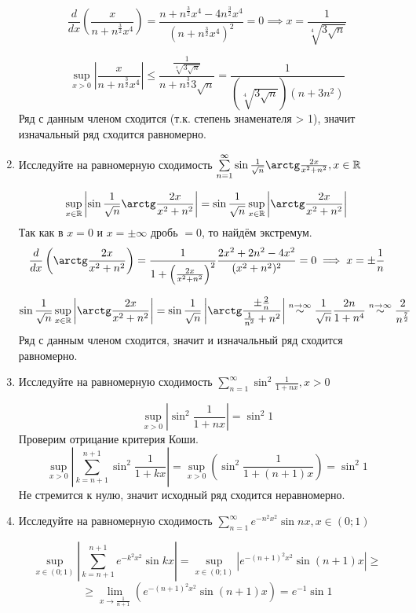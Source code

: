 \documentclass{article}
\begin{document}
\begin{large}
\begin{enumerate}
$$ \frac{d}{dx} \left( \frac{x}{n + n^{\frac{3}{2}}x^4} \right) = \frac{n + n^{\frac{3}{2}}x^4 - 4n^{\frac{3}{2}}x^4}{(n + n^{\frac{3}{2}}x^4)^2} = 0 \implies x = \frac{1}{\sqrt[4]{3\sqrt{n}}} $$

$$ \sup_{x>0} \left| \frac{x}{n + n^{\frac{3}{2}}x^4} \right| \leq \frac{\frac{1}{\sqrt[4]{3\sqrt{n}}}}{n + n^{\frac{3}{2}} 3\sqrt{n}} = \frac{1}{(\sqrt[4]{3\sqrt{n}})(n + 3n^2)}$$
Ряд с данным членом сходится (т.к. степень знаменателя > 1), значит изначальный ряд сходится равномерно.

\item Исследуйте на равномерную сходимость $ \sum\limits_{n=1}^{\infty} \sin \frac{1}{\sqrt{n}} \arctg \frac{2x}{x^2 + n^2}, x \in \mathbb{R} $

$$ \sup_{x \in \mathbb{R}} \left| \sin \frac{1}{\sqrt{n}} \arctg \frac{2x}{x^2 + n^2} \right| = \sin \frac{1}{\sqrt{n}} \sup_{x \in \mathbb{R}} \left| \arctg \frac{2x}{x^2 + n^2} \right|  $$
Так как в $x = 0$ и $x = \pm\infty$ дробь $= 0$, то найдём экстремум. 
$$ \frac{d}{dx} \left( \arctg \frac{2x}{x^2+n^2} \right) = \frac{1}{1 + \left(\frac{2x}{x^2+n^2}\right)^2} \frac{2x^2 + 2n^2 - 4x^2}{(x^2+n^2)^2} = 0 \implies x = \pm\frac{1}{n} $$ 

$$ \sin \frac{1}{\sqrt{n}} \sup_{x \in \mathbb{R}} \left| \arctg \frac{2x}{x^2 + n^2} \right| = \sin \frac{1}{\sqrt{n}} \left| \arctg \frac{\pm\frac{2}{n}}{\frac{1}{n^2} + n^2} \right| \stackrel{n\to\infty}{\sim} 
\frac{1}{\sqrt{n}} \frac{2n}{1+n^4} \stackrel{n\to\infty}{\sim} \frac{2}{n^\frac{7}{2}} $$
Ряд с данным членом сходится, значит и изначальный ряд сходится равномерно.

\item Исследуйте на равномерную сходимость $ \sum\limits_{n=1}^{\infty} \sin^2 \frac{1}{1+nx}, x > 0 $

$$ \sup_{x>0} \left| \sin^2 \frac{1}{1+nx} \right| = \sin^2 1 $$
Проверим отрицание критерия Коши.
$$ \sup_{x>0} \left| \sum_{k=n+1}^{n+1} \sin^2 \frac{1}{1+kx} \right| = \sup_{x>0} \left( \sin^2 \frac{1}{1+(n+1)x} \right) = \sin^2 1 $$
Не стремится к нулю, значит исходный ряд сходится неравномерно. 

\item Исследуйте на равномерную сходимость $ \sum\limits_{n=1}^{\infty} e^{-n^2x^2} \sin nx, x\in(0;1) $

$$ \sup_{x \in (0;1)} \left| \sum_{k=n+1}^{n+1} e^{-k^2x^2} \sin kx \right|
= \sup_{x \in (0;1)} \left| e^{-(n+1)^2x^2} \sin (n+1)x \right| \geq $$
$$\geq \lim_{x\to\frac{1}{n+1}} \left( e^{-(n+1)^2x^2} \sin (n+1)x \right) = e^{-1} \sin 1 $$


\end{enumerate}
\end{large}
\end{document}
